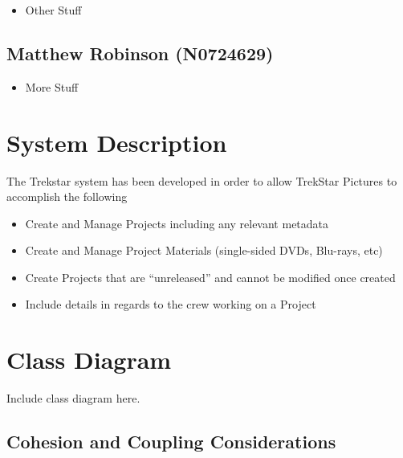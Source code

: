 \documentclass[
  english,
  a4paper,
,tablecaptionabove
]{scrartcl}
\providecommand{\tightlist}{%
  \setlength{\itemsep}{0pt}\setlength{\parskip}{0pt}}
\begin{document}
\begin{itemize}
\tightlist
\item
  Other Stuff
\end{itemize}

\hypertarget{matthew-robinson-n0724629}{%
\subsection{Matthew Robinson
(N0724629)}\label{matthew-robinson-n0724629}}

\begin{itemize}
\tightlist
\item
  More Stuff
\end{itemize}

\newpage

\hypertarget{system-description}{%
\section{System Description}\label{system-description}}

The Trekstar system has been developed in order to allow TrekStar
Pictures to accomplish the following

\begin{itemize}
\tightlist
\item
  Create and Manage Projects including any relevant metadata
\item
  Create and Manage Project Materials (single-sided DVDs, Blu-rays, etc)
\item
  Create Projects that are \enquote{unreleased} and cannot be modified
  once created
\item
  Include details in regards to the crew working on a Project
\end{itemize}

\newpage

\hypertarget{class-diagram}{%
\section{Class Diagram}\label{class-diagram}}

Include class diagram here.

\hypertarget{cohesion-and-coupling-considerations}{%
\subsection{Cohesion and Coupling
Considerations}\label{cohesion-and-coupling-considerations}}
\end{document}
